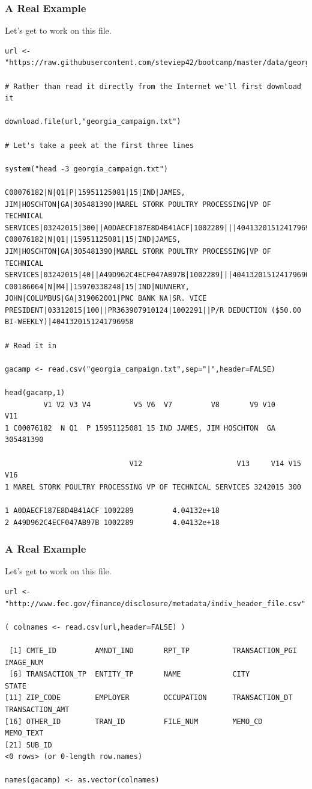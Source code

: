 \documentclass{beamer}
\begin{document}
% 

\begin{frame}[fragile]
\frametitle{A Real Example}Let's get to work on this file.
\tiny
\begin{verbatim}
url <- "https://raw.githubusercontent.com/steviep42/bootcamp/master/data/georgia_campaign.txt"

# Rather than read it directly from the Internet we'll first download it

download.file(url,"georgia_campaign.txt")

# Let's take a peek at the first three lines

system("head -3 georgia_campaign.txt")

C00076182|N|Q1|P|15951125081|15|IND|JAMES, JIM|HOSCHTON|GA|305481390|MAREL STORK POULTRY PROCESSING|VP OF TECHNICAL SERVICES|03242015|300||A0DAECF187E8D4B41ACF|1002289|||4041320151241796907
C00076182|N|Q1||15951125081|15|IND|JAMES, JIM|HOSCHTON|GA|305481390|MAREL STORK POULTRY PROCESSING|VP OF TECHNICAL SERVICES|03242015|40||A49D962C4ECF047AB97B|1002289|||4041320151241796908
C00186064|N|M4||15970338248|15|IND|NUNNERY, JOHN|COLUMBUS|GA|319062001|PNC BANK NA|SR. VICE PRESIDENT|03312015|100||PR363907910124|1002291||P/R DEDUCTION ($50.00 BI-WEEKLY)|4041320151241796958

# Read it in

gacamp <- read.csv("georgia_campaign.txt",sep="|",header=FALSE)

head(gacamp,1)
         V1 V2 V3 V4          V5 V6  V7         V8       V9 V10       V11
1 C00076182  N Q1  P 15951125081 15 IND JAMES, JIM HOSCHTON  GA 305481390

                             V12                      V13     V14 V15 V16
1 MAREL STORK POULTRY PROCESSING VP OF TECHNICAL SERVICES 3242015 300    

1 A0DAECF187E8D4B41ACF 1002289         4.04132e+18
2 A49D962C4ECF047AB97B 1002289         4.04132e+18

\end{verbatim}
\end{frame}

%

% 

\begin{frame}[fragile]
\frametitle{A Real Example}Let's get to work on this file.
\tiny
\begin{verbatim}
url <- "http://www.fec.gov/finance/disclosure/metadata/indiv_header_file.csv"

( colnames <- read.csv(url,header=FALSE) )

 [1] CMTE_ID         AMNDT_IND       RPT_TP          TRANSACTION_PGI IMAGE_NUM      
 [6] TRANSACTION_TP  ENTITY_TP       NAME            CITY            STATE          
[11] ZIP_CODE        EMPLOYER        OCCUPATION      TRANSACTION_DT  TRANSACTION_AMT
[16] OTHER_ID        TRAN_ID         FILE_NUM        MEMO_CD         MEMO_TEXT      
[21] SUB_ID         
<0 rows> (or 0-length row.names)

names(gacamp) <- as.vector(colnames)



\end{verbatim}
\end{frame}
\end{document}
